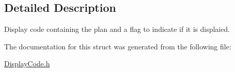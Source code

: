 \subsection{Detailed Description}
Display code containing the plan and a flag to indicate if it is displaied. 

The documentation for this struct was generated from the following file\+:\begin{DoxyCompactItemize}
\item 
\hyperlink{DisplayCode_8h}{Display\+Code.\+h}\end{DoxyCompactItemize}

